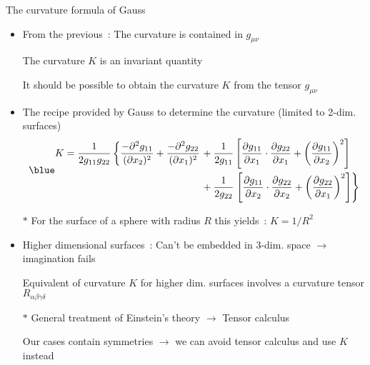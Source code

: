 \Tr
\begin{center}
{\blue The curvature formula of Gauss}
\end{center}
%
\begin{itemize}
\item From the previous~: {\red The curvature is contained in $g_{\mu\nu}$}
\item[] The {\blue curvature $K$} is an invariant quantity
\item[] It should be possible to obtain the curvature $K$ from the tensor $g_{\mu\nu}$
\item The recipe provided by Gauss to determine the curvature (limited to 2-dim. surfaces)
      \begin{equation*}
      {\blue
      \begin{split}
       K=\frac{1}{2g_{11}g_{22}} \left\{
       \frac{-\partial^{2}g_{11}}{(\partial x_{2})^{2}}+\frac{-\partial^{2}g_{22}}{(\partial x_{1})^{2}} \right.
     &+\frac{1}{2g_{11}} \left[
       \frac{\partial g_{11}}{\partial x_{1}} \cdot \frac{\partial g_{22}}{\partial x_{1}}
       +\left(\frac{\partial g_{11}}{\partial x_{2}}\right)^{2} \right] \\
     &+\frac{1}{2g_{22}} \left. \left[
       \frac{\partial g_{11}}{\partial x_{2}} \cdot \frac{\partial g_{22}}{\partial x_{2}}
       +\left(\frac{\partial g_{22}}{\partial x_{1}}\right)^{2} \right] \right\} \\
      \end{split}
      }
      \end{equation*}
\item[$\ast$] For the surface of a sphere with radius $R$ this yields~: $K=1/R^{2}$
\item Higher dimensional surfaces~: Can't be embedded in 3-dim. space $\rightarrow$ imagination fails
\item[] Equivalent of curvature $K$ for higher dim. surfaces involves a
        {\blue curvature tensor $R_{\alpha\beta\gamma\delta}$}
\item[$\ast$] General treatment of Einstein's theory $\rightarrow$ {\blue Tensor calculus}
\item[] Our cases contain symmetries $\rightarrow$ we can avoid tensor calculus and use $K$ instead
\end{itemize}
